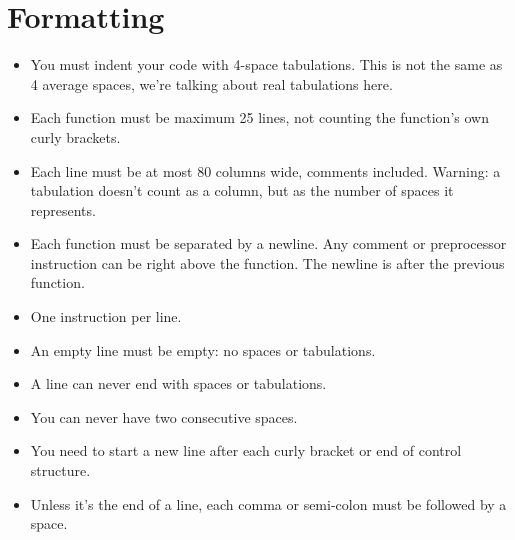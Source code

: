 \documentclass{42-en}
\begin{document}
    \section{Formatting}

            \begin{itemize}

                \item You must indent your code with 4-space
                  tabulations. This is not the same as 4 average
                  spaces, we're talking about real tabulations here.

                \item Each function must be maximum 25 lines, not
                  counting the function's own curly brackets.

                \item Each line must be at most 80 columns wide, comments
                  included. Warning: a tabulation doesn't count
                  as a column, but as the number of spaces it
                  represents.

                \item Each function must be separated by a newline. Any comment or preprocessor instruction
                    can be right above the function. The newline is after the previous function.

                \item One instruction per line.

                \item An empty line must be empty: no spaces or tabulations.

                \item A line can never end with spaces or tabulations.

                \item You can never have two consecutive spaces.

                \item You need to start a new line after each curly bracket
                  or end of control structure.

                \item Unless it's the end of a line, each comma or semi-colon
                  must be followed by a space.


\end{itemize}
\end{document}
